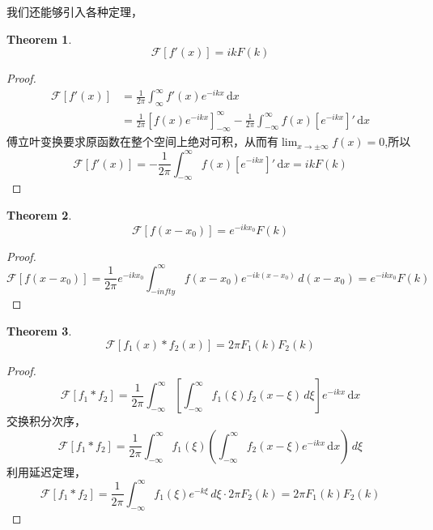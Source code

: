 \documentclass[12pt,a4paper,openany,twoside]{book}
\newtheorem{theorem}{Theorem}[section]
\numberwithin{equation}{section}
\newcommand{\ud}{\mathrm{d}}
\begin{document}
        我们还能够引入各种定理，
        \begin{theorem}
          \begin{equation}
            \mathcal{F}[f'(x)] = ik F(k)
          \end{equation}
        \end{theorem}
        \begin{proof}
          \begin{align*}
            \mathcal{F}[f'(x)] &=\frac{1}{2\pi}\int ^\infty_\infty f'(x) e^{-ik x} \, \ud x \\
                  &= \frac{1}{2\pi}\left[ f(x) e^{-ik x} \right] ^\infty _{-\infty} - \frac{1}{2\pi}\int ^\infty _{-\infty} f(x) \left[ e^{-ik x} \right] ' \, \ud x 
          \end{align*}
          傅立叶变换要求原函数在整个空间上绝对可积，从而有$\lim_{x\to \pm \infty} f(x) = 0$,所以
          \begin{equation*}
            \mathcal{F}[f'(x)] = - \frac{1}{2\pi}\int ^\infty_{-\infty} f(x) \left[ e^{-ik x} \right] '  \, \ud x = ik F(k) 
          \end{equation*} 
        \end{proof}
        \begin{theorem}
          \begin{equation}
            \mathcal{F}[f(x-x_0)] = e^{-ikx_0} F(k)
          \end{equation}
        \end{theorem}
        \begin{proof}
          \begin{equation*}
            \mathcal{F}[f(x-x_0)] =\frac{1}{2\pi} e^{-ikx_0}\int ^\infty_{-infty} f(x-x_0) e^{-ik(x-x_0)} \, d(x-x_0) = e^{-ikx_0} F(k)
          \end{equation*} 
        \end{proof}
        \begin{theorem}
          \begin{equation}
            \mathcal{F}[f_1(x) * f_2(x)] = 2\pi F_1(k)F_2(k)
          \end{equation}
        \end{theorem}
        \begin{proof}
          \begin{equation*}
            \mathcal{F}[f_1*f_2] = \frac{1}{2\pi}\int ^\infty_{-\infty} \left[ \int ^\infty_{-\infty} f_1(\xi) f_2(x-\xi) \, d\xi   \right] e^{-ikx} \, \ud x 
          \end{equation*} 
          交换积分次序，
          \begin{equation*}
            \mathcal{F}[f_1*f_2] = \frac{1}{2\pi} \int ^\infty _{-\infty} f_1(\xi) \left( \int ^\infty_{-\infty} f_2(x-\xi) e^{-ik x} \, \ud x  \right) \, d\xi 
          \end{equation*} 
          利用延迟定理，
          \begin{equation*}
            \mathcal{F}[f_1 * f_2] = \frac{1}{2\pi} \int ^\infty_{-\infty} f_1(\xi) e^{-k\xi} \, d\xi \cdot 2\pi F_2(k) = 2\pi F_1(k)F_2(k)
          \end{equation*} 
        \end{proof}
\end{document}
